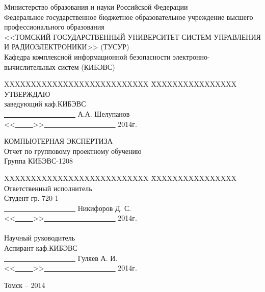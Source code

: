 \newpage
{}

\begin{center}
Министерство образования и науки Российской Федерации\\
Федеральное государственное бюджетное образовательное учреждение высшего профессионального образования\\
<<ТОМСКИЙ ГОСУДАРСТВЕННЫЙ УНИВЕРСИТЕТ СИСТЕМ УПРАВЛЕНИЯ И РАДИОЭЛЕКТРОНИКИ>> (ТУСУР)\\
Кафедра комплексной информационной безопасности электронно-вычислительных систем (КИБЭВС)\\
\end{center}

\begin{tabbing}
XXXXXXXXXXXXXXXXXXXXXXXXXXX \=
XXXXXXXXXXXXXXXX\kill
\> УТВЕРЖДАЮ\\
\> заведующий каф.КИБЭВС\\
\> \underline{\ \ \ \ \ \ \ \ \ \ \ \ \ \ \ \ \ \ \ \ } А.А. Шелупанов\\
\> <<\underline{\ \ \ \ \ }>>\underline{\ \ \ \ \ \ \ \ \ \ \ \ \ \ \ \ \ \ \ \ } 2014г.\\
\end{tabbing}

\begin{center}
КОМПЬЮТЕРНАЯ ЭКСПЕРТИЗА\\
Отчет по групповому проектному обучению\\
Группа КИБЭВС-1208\\
\end{center}

\begin{tabbing}
XXXXXXXXXXXXXXXXXXXXXXXXXXX \=
XXXXXXXXXXXXXXXX\kill
\> Ответственный исполнитель\\
\> Студент гр. 720-1\\
\> \underline{\ \ \ \ \ \ \ \ \ \ \ \ \ \ \ \ \ \ \ \ } Никифоров Д. С.\\
\> <<\underline{\ \ \ \ \ }>>\underline{\ \ \ \ \ \ \ \ \ \ \ \ \ \ \ \ \ \ \ \ } 2014г.\\
\ \\
\> Научный руководитель\\
\> Аспирант каф.КИБЭВС\\
\> \underline{\ \ \ \ \ \ \ \ \ \ \ \ \ \ \ \ \ \ \ \ } Гуляев А. И.\\
\> <<\underline{\ \ \ \ \ }>>\underline{\ \ \ \ \ \ \ \ \ \ \ \ \ \ \ \ \ \ \ \ } 2014г.\\
\end{tabbing}
\vfill
\begin{center}
Томск -- 2014
\end{center}